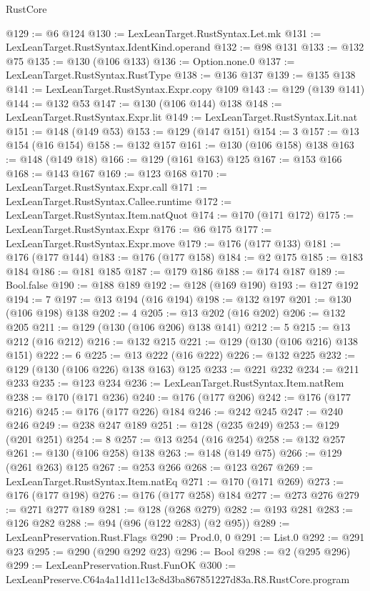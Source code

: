 \begin{lexlean}{RustCore}
\begin{coremodule}
@129 := @6 @124
@130 := LexLeanTarget.RustSyntax.Let.mk
@131 := LexLeanTarget.RustSyntax.IdentKind.operand
@132 := @98 @131
@133 := @132 @75
@135 := @130 (@106 @133)
@136 := Option.none.{0}
@137 := LexLeanTarget.RustSyntax.RustType
@138 := @136 @137
@139 := @135 @138
@141 := LexLeanTarget.RustSyntax.Expr.copy @109
@143 := @129 (@139 @141)
@144 := @132 @53
@147 := @130 (@106 @144) @138
@148 := LexLeanTarget.RustSyntax.Expr.lit
@149 := LexLeanTarget.RustSyntax.Lit.nat
@151 := @148 (@149 @53)
@153 := @129 (@147 @151)
@154 := 3
@157 := @13 @154 (@16 @154)
@158 := @132 @157
@161 := @130 (@106 @158) @138
@163 := @148 (@149 @18)
@166 := @129 (@161 @163) @125
@167 := @153 @166
@168 := @143 @167
@169 := @123 @168
@170 := LexLeanTarget.RustSyntax.Expr.call
@171 := LexLeanTarget.RustSyntax.Callee.runtime
@172 := LexLeanTarget.RustSyntax.Item.natQuot
@174 := @170 (@171 @172)
@175 := LexLeanTarget.RustSyntax.Expr
@176 := @6 @175
@177 := LexLeanTarget.RustSyntax.Expr.move
@179 := @176 (@177 @133)
@181 := @176 (@177 @144)
@183 := @176 (@177 @158)
@184 := @2 @175
@185 := @183 @184
@186 := @181 @185
@187 := @179 @186
@188 := @174 @187
@189 := Bool.false
@190 := @188 @189
@192 := @128 (@169 @190)
@193 := @127 @192
@194 := 7
@197 := @13 @194 (@16 @194)
@198 := @132 @197
@201 := @130 (@106 @198) @138
@202 := 4
@205 := @13 @202 (@16 @202)
@206 := @132 @205
@211 := @129 (@130 (@106 @206) @138 @141)
@212 := 5
@215 := @13 @212 (@16 @212)
@216 := @132 @215
@221 := @129 (@130 (@106 @216) @138 @151)
@222 := 6
@225 := @13 @222 (@16 @222)
@226 := @132 @225
@232 := @129 (@130 (@106 @226) @138 @163) @125
@233 := @221 @232
@234 := @211 @233
@235 := @123 @234
@236 := LexLeanTarget.RustSyntax.Item.natRem
@238 := @170 (@171 @236)
@240 := @176 (@177 @206)
@242 := @176 (@177 @216)
@245 := @176 (@177 @226) @184
@246 := @242 @245
@247 := @240 @246
@249 := @238 @247 @189
@251 := @128 (@235 @249)
@253 := @129 (@201 @251)
@254 := 8
@257 := @13 @254 (@16 @254)
@258 := @132 @257
@261 := @130 (@106 @258) @138
@263 := @148 (@149 @75)
@266 := @129 (@261 @263) @125
@267 := @253 @266
@268 := @123 @267
@269 := LexLeanTarget.RustSyntax.Item.natEq
@271 := @170 (@171 @269)
@273 := @176 (@177 @198)
@276 := @176 (@177 @258) @184
@277 := @273 @276
@279 := @271 @277 @189
@281 := @128 (@268 @279)
@282 := @193 @281
@283 := @126 @282
@288 := @94 (@96 (@122 @283) (@2 @95))
@289 := LexLeanPreservation.Rust.Flags
@290 := Prod.{0, 0}
@291 := List.{0}
@292 := @291 @23
@295 := @290 (@290 @292 @23)
@296 := Bool
@298 := @2 (@295 @296)
@299 := LexLeanPreservation.Rust.FunOK
@300 := LexLeanPreserve.C64a4a11d11c13c8d3ba867851227d83a.R8.RustCore.program

\end{coremodule}
\end{lexlean}
